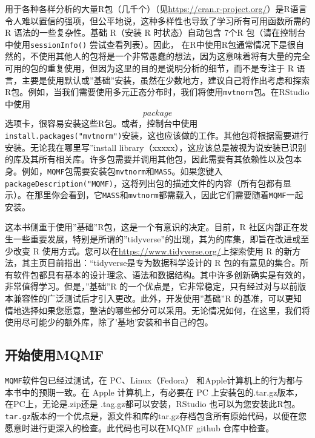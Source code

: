 \documentclass[
  lang=cn,
  11pt,
  scheme=chinese,
  chinesefont=nofont,
  citestyle=gb7714-2015,
  bibstyle=gb7714-2015]{elegantbook}
\begin{document}
用于各种各样分析的大量R包（几千个）（见\url{https://cran.r-project.org/}）是R语言令人难以置信的强项，但公平地说，这种多样性也导致了学习所有可用函数所需的 R 语法的一些复杂性。基础 R（安装 R 时状态）自动包含 7个R 包（请在控制台中使用\texttt{sessionInfo()} 尝试查看列表）。因此， 在R中使用R包通常情况下是很自然的，不使用其他人的包将是一个非常愚蠢的想法，因为这意味着将有大量的完全可用的包的重复使用，但因为这里的目的是说明分析的细节，而不是专注于 R 语言，主要是使用默认或''基础''安装，虽然在少数地方，建议自己将作出考虑和探索R包。例如，当我们需要使用多元正态分布时，我们将使用\texttt{mvtnorm}包。在RStudio中使用 \[package\] 选项卡，很容易安装这些R包。或者，控制台中使用\texttt{install.packages("mvtnorm")}安装，这也应该做的工作。其他包将根据需要进行安装。无论我在哪里写''install library（xxxxx），这应该总是被视为说安装已识别的库及其所有相关库。许多包需要并调用其他包，因此需要有其依赖性以及包本身。例如，\texttt{MQMF}包需要安装包\texttt{mvtnorm}和\texttt{MASS}。如果您键入\texttt{packageDescription("MQMF)}，这将列出包的描述文件的内容（所有包都有显示）。在那里你会看到，它\texttt{MASS}和\texttt{mvtnorm}都需载入，因此它们需要随着\texttt{MQMF}一起安装。

这本书侧重于使用''基础''R包，这是一个有意识的决定。目前，R 社区内部正在发生一些重要发展，特别是所谓的''tidyverse''的出现，其为的库集，即旨在改进或至少改变 R 使用方式。您可以在\url{https://www.tidyverse.org/}上探索使用 R 的新方法，其主页目前指出：``tidyverse是专为数据科学设计的 R 包的有意见的集合。所有软件包都具有基本的设计理念、语法和数据结构。其中许多创新确实是有效的，非常值得学习。但是，''基础''R 的一个优点是，它非常稳定，只有经过对与以前版本兼容性的广泛测试后才引入更改。此外，开发使用''基础''R 的基准，可以更知情地选择如果您愿意，整洁的哪些部分可以采用。无论情况如何，在这里，我们将使用尽可能少的额外库，除了'基地'安装和书自己的包。

\subsection{开始使用MQMF}\label{ux5f00ux59cbux4f7fux7528mqmf}

\texttt{MQMF}软件包已经过测试，在 PC、Linux（Fedora） 和Apple计算机上的行为都与本书中的预期一致。在 Apple 计算机上，有必要在 PC 上安装包的.tar.gz版本，在PC上，无论是.zip还是 .tag.gz都可以安装，RStudio 也可以为您安装此R包。\texttt{tar.gz}版本的一个优点是，源文件和库的tar.gz存档包含所有原始代码，以便在您愿意时进行更深入的检查。此代码也可以在MQMF github 仓库中检查。
\end{document}
